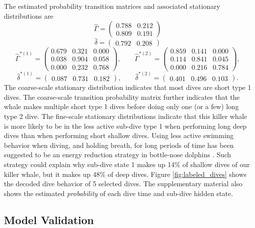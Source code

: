 The estimated probability transition matrices and associated stationary distributions are
%
$$\hat \Gamma = \begin{pmatrix} 
0.788 & 0.212 \\
0.809 & 0.191
\end{pmatrix}$$
$$\hat \delta = \begin{pmatrix} 0.792 & 0.208 \end{pmatrix}$$
%
$$\hat \Gamma^{*(1)} = \begin{pmatrix} 
0.679 & 0.321 & 0.000 \\
0.038 & 0.904 & 0.058 \\
0.000 & 0.232 & 0.768
\end{pmatrix}, \qquad 
\hat \Gamma^{*(2)} = \begin{pmatrix} 
0.859 & 0.141 & 0.000 \\
0.114 & 0.841 & 0.045 \\
0.000 & 0.216 & 0.784
\end{pmatrix},$$
$$\hat \delta^{*(1)} = \begin{pmatrix} 0.087 & 0.731 & 0.182 \end{pmatrix}, \qquad
\hat \delta^{*(2)} = \begin{pmatrix} 0.401 & 0.496 & 0.103 \end{pmatrix}.$$
%
The coarse-scale stationary distribution indicates that most dives are short type 1 dives. The coarse-scale transition probability matrix further indicates that the whale makes multiple short type 1 dives before doing only one (or a few) long type 2 dive. The fine-scale stationary distributions indicate that this killer whale is more likely to be in the less active sub-dive type 1 when performing long deep dives than when performing short shallow dives. Using less active swimming behavior when diving, and holding breath, for long periods of time has been suggested to be an energy reduction strategy in bottle-nose dolphins \citep{Williams:1999}. Such strategy could explain why sub-dive state 1 makes up 14\% of shallow dives of our killer whale, but it makes up 48\% of deep dives. Figure \ref{fig:labeled_dives} shows the decoded dive behavior of 5 selected dives. The supplementary material also shows the estimated \textit{probability} of each dive time and sub-dive hidden state.

\subsection{Model Validation}
\label{subsec:model_validation}

